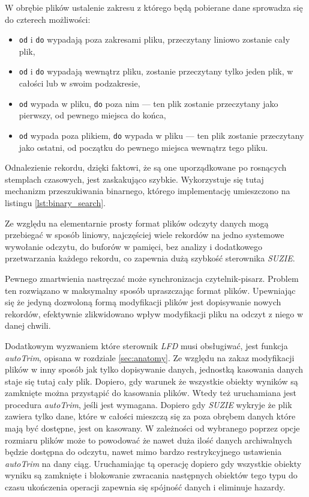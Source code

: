 \documentclass[a4paper,polish,12pt,twoside]{article}
\newcommand{\WorkLineSpread}{1.5}
\begin{document}
W obrębie plików ustalenie zakresu z którego będą pobierane dane sprowadza się do czterech możliwości:
\begin{itemize}
	\item \texttt{od} i \texttt{do} wypadają poza zakresami pliku, przeczytany liniowo zostanie cały plik,
	\item \texttt{od} i \texttt{do} wypadają wewnątrz pliku, zostanie przeczytany tylko jeden plik, w całości lub w swoim podzakresie,
	\item \texttt{od} wypada w pliku, \texttt{do} poza nim --- ten plik zostanie przeczytany jako pierwszy, od pewnego miejsca do końca,
	\item \texttt{od} wypada poza plikiem, \texttt{do} wypada w pliku --- ten plik zostanie przeczytany jako ostatni, od początku do pewnego miejsca wewnątrz tego pliku.
\end{itemize}

	Odnalezienie rekordu, dzięki faktowi, że są one uporządkowane po rosnących stemplach czasowych, jest zaskakująco szybkie. Wykorzystuje się tutaj mechanizm przeszukiwania binarnego, którego implementację umieszczono na listingu \ref{lst:binary_search}.

\begin{listing}
\linespread{1} \small  \linespread{\WorkLineSpread} \normalsize
\end{listing}

Ze względu na elementarnie prosty format plików odczyty danych mogą przebiegać w sposób liniowy, najczęściej wiele rekordów na jedno systemowe wywołanie odczytu, do buforów w pamięci, bez analizy i dodatkowego przetwarzania każdego rekordu, co zapewnia dużą szybkość sterownika \textit{SUZIE}.

Pewnego zmartwienia nastręczać może synchronizacja czytelnik-pisarz. Problem ten rozwiązano w maksymalny sposób upraszczając format plików. Upewniając się że jedyną dozwoloną formą modyfikacji plików jest dopisywanie nowych rekordów, efektywnie zlikwidowano wpływ modyfikacji pliku na odczyt z niego w danej chwili.

Dodatkowym wyzwaniem które sterownik \textit{LFD} musi obsługiwać, jest funkcja \textit{autoTrim}, opisana w rozdziale \ref{sec:anatomy}. Ze względu na zakaz modyfikacji plików w inny sposób jak tylko dopisywanie danych, jednostką kasowania danych staje się tutaj cały plik. Dopiero, gdy warunek że wszystkie obiekty wyników są zamknięte można przystąpić do kasowania plików. Wtedy też uruchamiana jest procedura \textit{autoTrim}, jeśli jest wymagana. Dopiero gdy \textit{SUZIE} wykryje że plik zawiera tylko dane, które w całości mieszczą się za poza obrębem danych które mają być dostępne, jest on kasowany. W zależności od wybranego poprzez opcje rozmiaru plików może to powodować że nawet duża ilość danych archiwalnych będzie dostępna do odczytu, nawet mimo bardzo restrykcyjnego ustawienia \textit{autoTrim} na dany ciąg. Uruchamiając tą operację dopiero gdy wszystkie obiekty wyniku są zamknięte i blokowanie zwracania następnych obiektów tego typu do czasu ukończenia operacji zapewnia się spójność danych i eliminuje hazardy.
\end{document}
